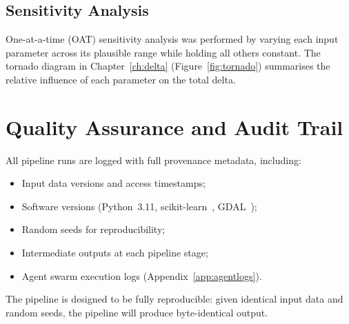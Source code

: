 \subsection{Sensitivity Analysis}

One-at-a-time (OAT) sensitivity analysis was performed by varying each input parameter across its plausible range while holding all others constant. The tornado diagram in Chapter~\ref{ch:delta} (Figure~\ref{fig:tornado}) summarises the relative influence of each parameter on the total delta.


\section{Quality Assurance and Audit Trail}

All pipeline runs are logged with full provenance metadata, including:
\begin{itemize}[nosep]
  \item Input data versions and access timestamps;
  \item Software versions (Python~3.11, scikit-learn~, GDAL~);
  \item Random seeds for reproducibility;
  \item Intermediate outputs at each pipeline stage;
  \item Agent swarm execution logs (Appendix~\ref{app:agentlogs}).
\end{itemize}

The pipeline is designed to be fully reproducible: given identical input data and random seeds, the pipeline will produce byte-identical output.
